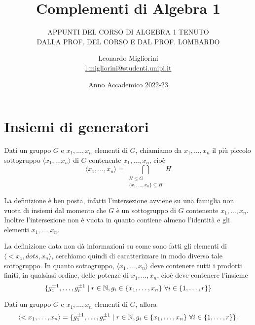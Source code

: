\documentclass[11pt]{scrartcl}
\begin{document}
\title{Complementi di Algebra 1}
\subtitle{\large\normalfont\rmfamily\scshape APPUNTI DEL CORSO DI ALGEBRA 1 TENUTO\\ DALLA PROF. DEL CORSO E DAL PROF. LOMBARDO}
\author{Leonardo Migliorini \\ \textnormal{\href{l.migliorini@studenti.unipi.it}{l.migliorini@studenti.unipi.it}}}
\date{Anno Accademico 2022-23}
\maketitle
\newpage

\tableofcontents
\eject

\newpage

\section{Insiemi di generatori}

\begin{definition}
    Dati un gruppo $G$ e $x_1, \ldots, x_n$ elementi di $G$, chiamiamo  da $x_1, \ldots, x_n$ il più piccolo sottogruppo $\langle x_1, \ldots x_n
    \rangle$ di $G$ contenente $x_1, \ldots, x_n$, cioè \[\langle x_1, \ldots, x_n\rangle =
    \bigcap_{\substack{H\leq G\\ \{x_1, \ldots, x_n\} \subseteq H}} H\] 
\end{definition}

\begin{remark}
    La definizione è ben posta, infatti l'intersezione avviene su una 
    famiglia non vuota di insiemi dal momento che $G$ è un sottogruppo di 
    $G$ contenente $x_1, \ldots, x_n$. Inoltre l'intersezione non è vuota in 
    quanto contiene almeno l'identità e gli elementi $x_1, \ldots, x_n$.
\end{remark}

La definizione data non dà informazioni su come sono fatti gli elementi di 
$\langle <x_1, dots, x_n\rangle$, cerchiamo quindi di caratterizzare in modo
diverso tale sottogruppo. In quanto sottogruppo, $\langle x_1, \ldots, x_n\rangle$
deve contenere tutti i prodotti finiti, in qualsiasi ordine, delle potenze di
$x_1, \ldots, x_n$, cioè deve contenere l'insieme 
\[\{g_1^{\pm 1}, \ldots, g_r^{\pm 1}\mid r \in \mathbb N, g_i \in \{x_1, \ldots, x_n\}
~\forall i \in \{1, \ldots, r\}\}\]

\begin{proposition}
\label{prop1.0}
Dati un gruppo $G$ e $x_1, \ldots, x_n$ elementi di $G$, allora \[
    \langle <x_1, \ldots, x_n\rangle = \{g_1^{\pm 1}, \ldots, g_r^{\pm 1}\mid r 
    \in \mathbb N, g_i \in \{x_1, \ldots, x_n\}~\forall i \in \{1, \ldots, r\}\}.
    \]
\end{proposition}
\end{document}
